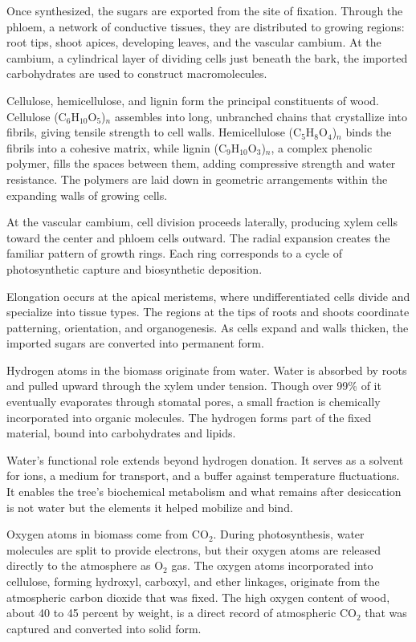 Once synthesized, the sugars are exported from the site of fixation. Through the phloem, a network of conductive tissues, they are distributed to growing regions: root tips, shoot apices, developing leaves, and the vascular cambium. At the cambium, a cylindrical layer of dividing cells just beneath the bark, the imported carbohydrates are used to construct macromolecules.

Cellulose, hemicellulose, and lignin form the principal constituents of wood. Cellulose (C\(_6\)H\(_{10}\)O\(_5\))\(_n\) assembles into long, unbranched chains that crystallize into fibrils, giving tensile strength to cell walls. Hemicellulose (C\(_5\)H\(_{8}\)O\(_4\))\(_n\) binds the fibrils into a cohesive matrix, while lignin (C\(_9\)H\(_{10}\)O\(_3\))\(_n\), a complex phenolic polymer, fills the spaces between them, adding compressive strength and water resistance. The polymers are laid down in geometric arrangements within the expanding walls of growing cells.

At the vascular cambium, cell division proceeds laterally, producing xylem cells toward the center and phloem cells outward. The radial expansion creates the familiar pattern of growth rings. Each ring corresponds to a cycle of photosynthetic capture and biosynthetic deposition.

Elongation occurs at the apical meristems, where undifferentiated cells divide and specialize into tissue types. The regions at the tips of roots and shoots coordinate patterning, orientation, and organogenesis. As cells expand and walls thicken, the imported sugars are converted into permanent form.

Hydrogen atoms in the biomass originate from water. Water is absorbed by roots and pulled upward through the xylem under tension. Though over 99\% of it eventually evaporates through stomatal pores, a small fraction is chemically incorporated into organic molecules. The hydrogen forms part of the fixed material, bound into carbohydrates and lipids.

Water's functional role extends beyond hydrogen donation. It serves as a solvent for ions, a medium for transport, and a buffer against temperature fluctuations. It enables the tree's biochemical metabolism and what remains after desiccation is not water but the elements it helped mobilize and bind.

Oxygen atoms in biomass come from \(\mathrm{CO}_2\). During photosynthesis, water molecules are split to provide electrons, but their oxygen atoms are released directly to the atmosphere as \(\mathrm{O}_2\) gas. The oxygen atoms incorporated into cellulose, forming hydroxyl, carboxyl, and ether linkages, originate from the atmospheric carbon dioxide that was fixed. The high oxygen content of wood, about 40 to 45 percent by weight, is a direct record of atmospheric \(\mathrm{CO}_2\) that was captured and converted into solid form.

